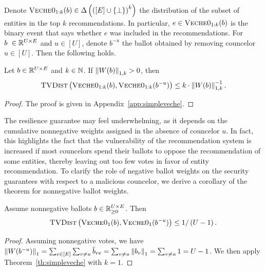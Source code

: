Denote $\textsc{Veche0}_{1:k} (b) \in \Delta\left( \left([E] \cup \left\lbrace \perp \right\rbrace\right)^k \right)$ 
the distribution 
of the subset of entities in the top $k$ recommendations.
In particular, $e \in \textsc{Veche0}_{1:k} (b)$ is the binary event that says whether $e$
was included in the recommendations.
For $b \in \setR^{U \times E}$ and $u \in [U]$,
denote $b^{-u}$ the ballot obtained by removing councelor $u \in [U]$.
Then the following holds.

\begin{theorem}
\label{th:simpleveche}
    Let $b \in \setR^{U \times E}$ and $k \in \mathbb N$.
    If $\left\lVert{W(b)}\right\rVert_{1, k} > 0$, then
    \begin{align}
        \textsc{TVDist} \left(
            \textsc{Veche0}_{1:k} (b),
            \textsc{Veche0}_{1:k} (b^{-u})
        \right)
        \leq k \cdot \left\lVert{W(b)}\right\rVert_{1, k}^{-1}.
    \end{align}
\end{theorem}

\begin{proof}
    The proof is given in Appendix~\ref{app:simpleveche}.
\end{proof}

The resilience guarantee may feel underwhelming, 
as it depends on the cumulative nonnegative weights assigned in the absence of councelor $u$.
In fact, this highlights the fact that the vulnerability of the recommendation system is increased
if most councelors spend their ballots to oppose the recommendation of some entities,
thereby leaving out too few votes in favor of entity recommendation.
To clarify the role of negative ballot weights on the security guarantees
with respect to a malicious councelor,
we derive a corollary of the theorem for nonnegative ballot weights.

\begin{corollary}
    Assume nonnegative ballots $b \in \mathbb R^{U \times E}_{\geq 0}$.
    Then
    \begin{align}
        \textsc{TVDist} \left( 
            \textsc{Veche0}_1(b), 
            \textsc{Veche0}_1(b^{-u})
        \right) 
        \leq 1 / \left( U - 1 \right).
    \end{align}
\end{corollary}

\begin{proof}
    Assuming nonnegative votes, we have 
    $\left\lVert{W(b^{-u})}\right\rVert_{1} 
    = \sum_{e \in [E]} \sum_{v \neq u} \tilde b_{ve} 
    = \sum_{v \neq u} \left\lVert{b_v}\right\rVert_{1} = \sum_{v \neq u} 1 
    = U - 1$.
    We then apply Theorem~\ref{th:simpleveche} with $k=1$.
\end{proof}


